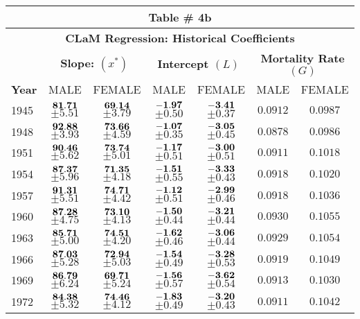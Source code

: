 \documentclass[10pt, titlepage]{article}%
\begin{document}
\begin{table}
  \begin{tabular}{||l|c|c|c|c|c|c||}
  \hline\hline
  \multicolumn{7}{||c||}{Table \# 4b } \\ \hline\hline
  \multicolumn{7}{||c||}{{\bf CLaM Regression: Historical Coefficients}} \\ \hline\hline
  
  { } & 
  \multicolumn{2}{|c|}{ \bf Slope: $(x^{*})$ } & 
  \multicolumn{2}{|c|}{ \bf Intercept $(L)$ }  &
  \multicolumn{2}{|c||}{ \bf Mortality Rate $(G)$ } \\ \hline\hline
  
  {\bf Year } &
  {MALE} & {FEMALE} &
  {MALE} & {FEMALE} &
  {MALE} & {FEMALE} \\ \hline\hline

  1945 &  $\bf 81.71$ $\pm 5.51$& $\bf 69.14$ $\pm 3.79$& $\bf -1.97$ $\pm 0.50$& $\bf -3.41$ $\pm 0.37$&  $0.0912$&  $0.0987$ \\ \hline\hline
  1948 &  $\bf 92.88$ $\pm 3.93$& $\bf 73.66$ $\pm 4.59$& $\bf -1.07$ $\pm 0.35$& $\bf -3.05$ $\pm 0.45$&  $0.0878$&  $0.0986$ \\ \hline\hline
  1951 &  $\bf 90.46$ $\pm 5.62$& $\bf 73.74$ $\pm 5.01$& $\bf -1.17$ $\pm 0.51$& $\bf -3.00$ $\pm 0.51$&  $0.0911$&  $0.1018$ \\ \hline\hline
  1954 &  $\bf 87.37$ $\pm 5.96$& $\bf 71.35$ $\pm 4.18$& $\bf -1.51$ $\pm 0.55$& $\bf -3.33$ $\pm 0.43$&  $0.0918$&  $0.1020$ \\ \hline\hline
  1957 &  $\bf 91.31$ $\pm 5.51$& $\bf 74.71$ $\pm 4.42$& $\bf -1.12$ $\pm 0.51$& $\bf -2.99$ $\pm 0.46$&  $0.0918$&  $0.1036$ \\ \hline\hline
  1960 &  $\bf 87.28$ $\pm 4.75$& $\bf 73.10$ $\pm 4.13$& $\bf -1.50$ $\pm 0.44$& $\bf -3.21$ $\pm 0.44$&  $0.0930$&  $0.1055$ \\ \hline\hline
  1963 &  $\bf 85.71$ $\pm 5.00$& $\bf 74.51$ $\pm 4.20$& $\bf -1.62$ $\pm 0.46$& $\bf -3.06$ $\pm 0.44$&  $0.0929$&  $0.1054$ \\ \hline\hline
  1966 &  $\bf 87.03$ $\pm 5.28$& $\bf 72.94$ $\pm 5.03$& $\bf -1.54$ $\pm 0.49$& $\bf -3.28$ $\pm 0.53$&  $0.0919$&  $0.1049$ \\ \hline\hline
  1969 &  $\bf 86.79$ $\pm 6.24$& $\bf 69.71$ $\pm 5.24$& $\bf -1.56$ $\pm 0.57$& $\bf -3.62$ $\pm 0.54$&  $0.0913$&  $0.1030$ \\ \hline\hline
  1972 &  $\bf 84.38$ $\pm 5.32$& $\bf 74.46$ $\pm 4.12$& $\bf -1.83$ $\pm 0.49$& $\bf -3.20$ $\pm 0.43$&  $0.0911$&  $0.1042$ \\ \hline\hline

\end{tabular}
\end{table}
\end{document}
